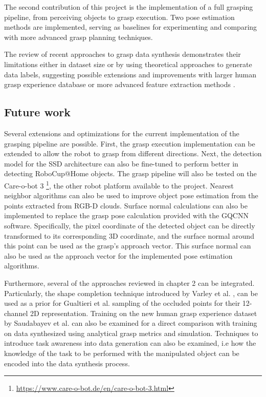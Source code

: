 \documentclass[runningheads]{../llncs}
\begin{document}
The second contribution of this project is the implementation of a full grasping pipeline, from perceiving objects to
grasp execution. Two pose estimation methods are implemented, serving as baselines for experimenting and comparing with
more advanced grasp planning techniques.

The review of recent approaches to grasp data synthesis demonstrates their limitations either in dataset size or by
using theoretical approaches to generate data labels, suggesting possible extensions and improvements with larger human
grasp experience database \cite{Saudabayev2018} or more advanced feature extraction methods \cite{Varley2017}.

\subsection{Future work}

Several extensions and optimizations for the current implementation of the grasping pipeline are possible. First, the
grasp execution implementation can be extended to allow the robot to grasp from different directions. Next, the
detection model for the SSD architecture can also be fine-tuned to perform better in detecting RoboCup@Home objects.
The grasp pipeline will also be tested on the Care-o-bot 3
\footnote{\url{https://www.care-o-bot.de/en/care-o-bot-3.html}}, the other robot platform available to the project.
Nearest neighbor algorithms can also be used to improve object pose estimation from the points extracted from RGB-D
clouds. Surface normal calculations can also be implemented to replace the grasp pose calculation provided with the
GQCNN software. Specifically, the pixel coordinate of the detected object can be directly transformed to its
corresponding 3D coordinate, and the surface normal around this point can be used as the grasp's approach vector. This
surface normal can also be used as the approach vector for the implemented pose estimation algorithms.

Furthermore, several of the approaches reviewed in chapter 2 can be integrated. Particularly, the shape completion
technique introduced by Varley et al. \cite{Varley2017}, can be used as a prior for Gualtieri et al.
\cite{Gualtieri2016} sampling of the occluded points for their 12-channel 2D representation. Training on the new human
grasp experience dataset by Saudabayev et al. \cite{Saudabayev2018} can also be examined for a direct comparison with
training on data synthesized using analytical grasp metrics and simulation. Techniques to introduce task awareness into
data generation can also be examined, i.e how the knowledge of the task to be performed with the manipulated object can
be encoded into the data synthesis process.

%

{
    \footnotesize
    
}
%
\end{document}
